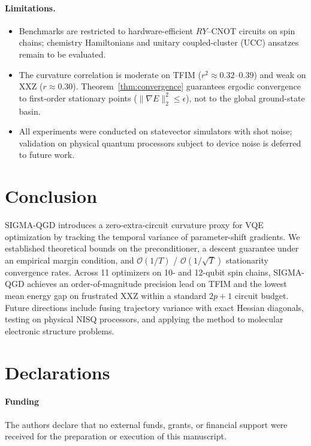 \documentclass[sn-mathphys,Numbered]{sn-jnl}
\theoremstyle{thmstyleone}
\theoremstyle{thmstyletwo}
\theoremstyle{thmstylethree}
\begin{document}
\paragraph{Limitations.}
\begin{itemize}
    \item Benchmarks are restricted to hardware-efficient $RY$--CNOT circuits on spin chains; chemistry Hamiltonians and unitary coupled-cluster (UCC) ansatzes remain to be evaluated.
    \item The curvature correlation is moderate on TFIM ($r^2 \approx 0.32$--$0.39$) and weak on XXZ ($r \approx 0.30$). Theorem~\ref{thm:convergence} guarantees ergodic convergence to first-order stationary points ($\|\nabla E\|_2^2 \le \epsilon$), not to the global ground-state basin.
    \item All experiments were conducted on statevector simulators with shot noise; validation on physical quantum processors subject to device noise is deferred to future work.
\end{itemize}

\section{Conclusion}
\label{sec:conclusion}
SIGMA-QGD introduces a zero-extra-circuit curvature proxy for VQE optimization by tracking the temporal variance of parameter-shift gradients. We established theoretical bounds on the preconditioner, a descent guarantee under an empirical margin condition, and $\mathcal{O}(1/T)$ / $\mathcal{O}(1/\sqrt{T})$ stationarity convergence rates. Across 11 optimizers on 10- and 12-qubit spin chains, SIGMA-QGD achieves an order-of-magnitude precision lead on TFIM and the lowest mean energy gap on frustrated XXZ within a standard $2p+1$ circuit budget. Future directions include fusing trajectory variance with exact Hessian diagonals, testing on physical NISQ processors, and applying the method to molecular electronic structure problems.

\section*{Declarations}

\paragraph{Funding}
The authors declare that no external funds, grants, or financial support were received for the preparation or execution of this manuscript.
\end{document}
